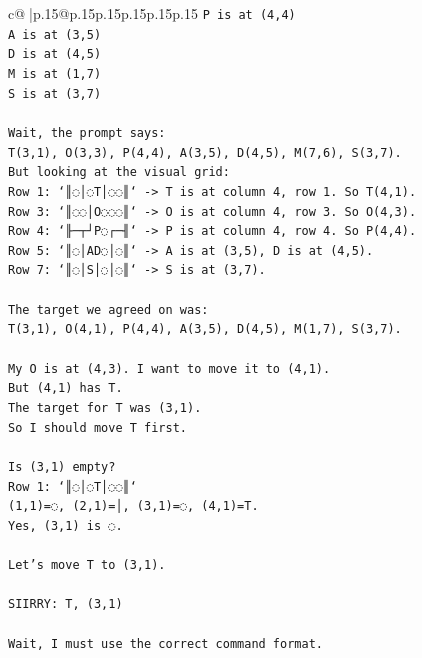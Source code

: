 \documentclass{article}
\begin{document}
{\begin{supertabular}{c@{$\;$}|p{.15\linewidth}@{}p{.15\linewidth}p{.15\linewidth}p{.15\linewidth}p{.15\linewidth}p{.15\linewidth}}
{{{\texttt{P is at (4,4)} \\
\texttt{A is at (3,5)} \\
\texttt{D is at (4,5)} \\
\texttt{M is at (1,7)} \\
\texttt{S is at (3,7)} \\
\\ 
\texttt{Wait, the prompt says:} \\
\texttt{T(3,1), O(3,3), P(4,4), A(3,5), D(4,5), M(7,6), S(3,7).} \\
\texttt{But looking at the visual grid:} \\
\texttt{Row 1: `║◌│◌T│◌◌║` {-}> T is at column 4, row 1. So T(4,1).} \\
\texttt{Row 3: `║◌◌│O◌◌◌║` {-}> O is at column 4, row 3. So O(4,3).} \\
\texttt{Row 4: `╟─┬┘P◌┌─╢` {-}> P is at column 4, row 4. So P(4,4).} \\
\texttt{Row 5: `║◌│AD◌│◌║` {-}> A is at (3,5), D is at (4,5).} \\
\texttt{Row 7: `║◌│S│◌│◌║` {-}> S is at (3,7).} \\
\\ 
\texttt{The target we agreed on was:} \\
\texttt{T(3,1), O(4,1), P(4,4), A(3,5), D(4,5), M(1,7), S(3,7).} \\
\\ 
\texttt{My O is at (4,3). I want to move it to (4,1).} \\
\texttt{But (4,1) has T.} \\
\texttt{The target for T was (3,1).} \\
\texttt{So I should move T first.} \\
\\ 
\texttt{Is (3,1) empty?} \\
\texttt{Row 1: `║◌│◌T│◌◌║`} \\
\texttt{(1,1)=◌, (2,1)=│, (3,1)=◌, (4,1)=T.} \\
\texttt{Yes, (3,1) is ◌.} \\
\\ 
\texttt{Let's move T to (3,1).} \\
\\ 
\texttt{SIIRRY: T, (3,1)} \\
\\ 
\texttt{Wait, I must use the correct command format.} \\
\\ 
}}}
\end{supertabular}}
\end{document}
